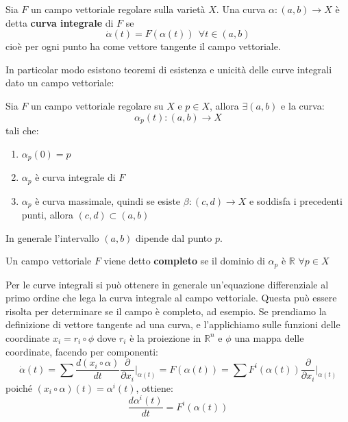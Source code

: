 \begin{definizione}
Sia $F$ un campo vettoriale regolare sulla varietà $X$. Una curva $\alpha : (a,b) \rightarrow X$ è detta \textbf{curva integrale} di $F$ se
\begin{equation*}
    \Dot{\alpha}(t) = F(\alpha(t)) \ \ \forall t \in (a,b)
\end{equation*}
cioè per ogni punto ha come vettore tangente il campo vettoriale.
\end{definizione}
In particolar modo esistono teoremi di esistenza e unicità delle curve integrali dato un campo vettoriale:
\begin{teorema}
Sia $F$ un campo vettoriale regolare su $X$ e $p \in X$, allora $\exists (a,b)$ e la curva:
\begin{equation*}
    \alpha_p(t) : (a,b) \rightarrow X
\end{equation*}
tali che:
\begin{enumerate}
    \item $\alpha_p(0) = p$
    \item $\alpha_p$ è curva integrale di $F$
    \item $\alpha_p$ è curva massimale, quindi se esiste $\beta :(c,d)\rightarrow X$ e soddisfa i precedenti punti, allora $(c,d) \subset (a,b)$
\end{enumerate}
\end{teorema}
In generale l'intervallo $(a,b)$ dipende dal punto $p$.
\begin{definizione}
    Un campo vettoriale $F$ viene detto \textbf{completo} se il dominio di $\alpha_p$ è $\mathbb{R}$ $\forall p \in X$
\end{definizione}

Per le curve integrali si può ottenere in generale un'equazione differenziale al primo ordine che lega la curva integrale al campo vettoriale. Questa può essere risolta per determinare se il campo è completo, ad esempio.
Se prendiamo la definizione di vettore tangente ad una curva, e l'applichiamo sulle funzioni delle coordinate $x_i = r_i \circ \phi$ dove $r_i$ è la proiezione in $\mathbb{R}^n$ e $\phi$ una mappa delle coordinate, facendo per componenti:
\begin{equation*}
    \Dot{\alpha}(t) = \sum \frac{d(x_i \circ \alpha)}{dt}\frac{\partial}{\partial x_i}\Big|_{\alpha(t)} = F(\alpha(t)) = \sum F^i(\alpha(t)) \frac{\partial}{\partial x_i}\Big|_{\alpha(t)}
\end{equation*}
poiché $(x_i \circ \alpha)(t)= \alpha^i(t)$, ottiene:
\begin{equation*}
    \frac{d\alpha^i(t)}{dt} = F^i(\alpha(t))
\end{equation*}
